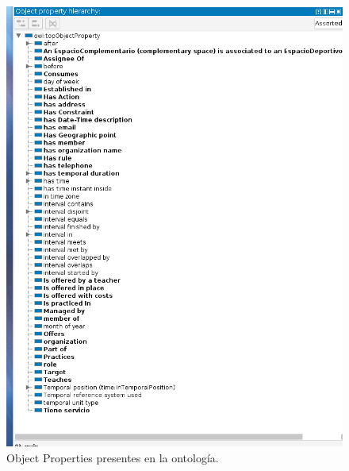 \documentclass[a4paper,12pt]{article}
\begin{document}
	\begin{figure}[H]
		\centering
		\includegraphics[width=\textwidth]{include/object.png}
		\caption{Object Properties presentes en la ontología.}
	\end{figure}
	
\end{document}
